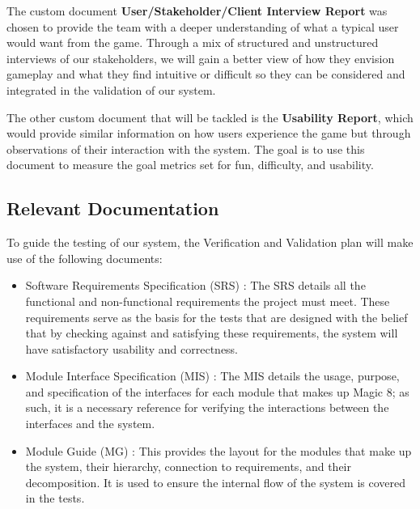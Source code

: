 \documentclass[12pt, titlepage]{article}
\renewcommand{\wss}[1]{}
\begin{document}
The custom document \textbf{User/Stakeholder/Client Interview Report} was chosen to provide the team with a deeper understanding of what
a typical user would want from the game. Through a mix of structured and unstructured interviews of our stakeholders, we will
gain a better view of how they envision gameplay and what they find intuitive or difficult so they can be considered and integrated in the validation
of our system.

The other custom document that will be tackled is the \textbf{Usability Report}, which would provide similar information on how users experience the game but through observations
of their interaction with the system. The goal is to use this document to measure the goal metrics set for fun, difficulty, and usability.

\subsection{Relevant Documentation}

\wss{Reference relevant documentation.  This will definitely include your SRS
  and your other project documents (design documents, like MG, MIS, etc).  You
  can include these even before they are written, since by the time the project
  is done, they will be written.  You can create BibTeX entries for your
  documents and within those entries include a hyperlink to the documents.}

To guide the testing of our system, the Verification and Validation plan will make use of the following documents:

  \begin{itemize}
  \item Software Requirements Specification (SRS) \citep{SRS}: The SRS details all the functional and non-functional requirements the project must meet. These requirements serve as the basis for the tests that are designed with the belief that by checking against and satisfying these requirements, the system will have satisfactory usability and correctness.
  \item Module Interface Specification (MIS) \citep{MISDoc}: The MIS details the usage, purpose, and specification of the interfaces for each module that makes up Magic 8; as such, it is a necessary reference for verifying the interactions between the interfaces and the system.
  \item Module Guide (MG) \citet{MGDoc}: This provides the layout for the modules that make up the system, their hierarchy, connection to requirements, and their decomposition. It is used to ensure the internal flow of the system is covered in the tests.
  \end{itemize}
\end{document}
